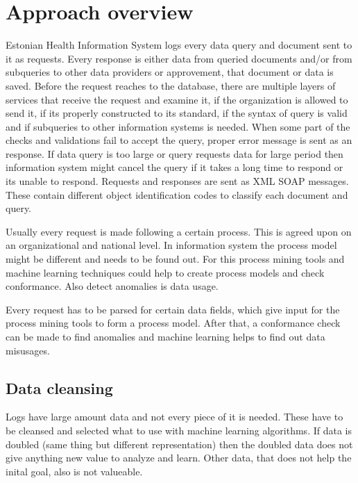 \documentclass[a4paper, 12pt]{article}
\let\stdsection\section
\renewcommand\section{\newpage\stdsection}
\begin{document}


\section{Approach overview}
Estonian Health Information System logs every data query and document sent to it as requests. Every response is either data from queried documents and/or from subqueries to other data providers or approvement, that document or data is saved. 
Before the request reaches to the database, there are multiple layers of services that receive the request and examine it, if the organization is allowed to send it, if its properly constructed to its standard, if the syntax of query is valid and if subqueries to other information systems is needed. When some part of the checks and validations fail to accept the query, proper error message is sent as an response. If data query is too large or query requests data for large period then information system might cancel the query if it takes a long time to respond or its unable to respond. 
Requests and responses are sent as XML SOAP messages. These contain different object identification codes to classify each document and query. 

Usually every request is made following a certain process. This is agreed upon on an organizational and national level. In information system the process model might be different and needs to be found out. For this process mining tools and machine learning techniques could help to create process models and check conformance. Also detect anomalies is data usage. 

Every request has to be parsed for certain data fields, which give input for the process mining tools to form a process model. After that, a conformance check can be made to find anomalies and machine learning helps to find out data misusages. 

\subsection{Data cleansing}
Logs have large amount data and not every piece of it is needed. These have to be cleansed and selected what to use with machine learning algorithms. If data is doubled (same thing but different representation) then the doubled data does not give anything new value to analyze and learn. Other data, that does not help the inital goal, also is not valueable. 
\end{document}
